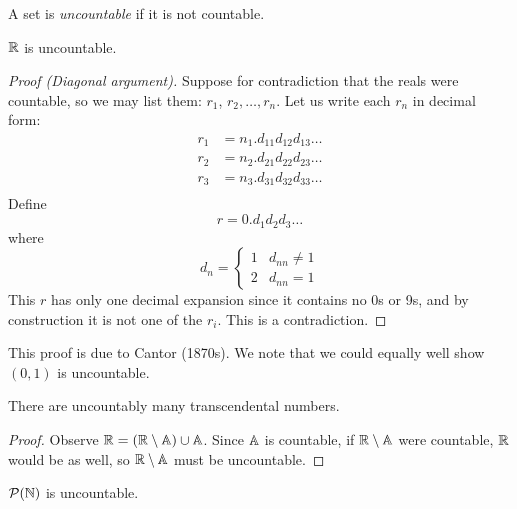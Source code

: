 \documentclass{../template/note}
\begin{document}
    \begin{definition}[Uncountability]
        A set is \emph{uncountable} if it is not countable.
    \end{definition}
    

    \begin{theorem}
        \(\RR\) is uncountable.
    \end{theorem}
    
    \begin{proof}[Proof (Diagonal argument)]
        Suppose for contradiction that the reals were countable, so we may list them: \(r_1\), \(r_2, \dots, r_n\). Let us write each \(r_n\) in decimal form:
        \begin{align*}
            r_1 &= n_1.d_{11}d_{12}d_{13}\dots \\
            r_2 &= n_2.d_{21}d_{22}d_{23}\dots \\
            r_3 &= n_3.d_{31}d_{32}d_{33}\dots \\
        \end{align*}
        Define
        \[
            r = 0.d_1d_2d_3\dots
        \]
        where
        \[
            d_n = \begin{cases}
                1 & d_{nn} \neq 1 \\
                2 & d_{nn} = 1
            \end{cases}
        \]
        This \(r\) has only one decimal expansion since it contains no 0s or 9s, and by construction it is not one of the \(r_i\). This is a contradiction.
    \end{proof}
    
    This proof is due to Cantor (1870s). We note that we could equally well show \((0, 1)\) is uncountable.

    \begin{corollary}
        There are uncountably many transcendental numbers.
    \end{corollary}
    
    \begin{proof}
        Observe \(\RR = (\RR \setminus \AA) \cup \AA\). Since \(\AA\) is countable, if \(\RR \setminus \AA\) were countable, \(\RR\) would be as well, so \(\RR \setminus \AA\) must be uncountable.
    \end{proof}
    
    \begin{theorem}
        \(\mathcal P(\NN)\) is uncountable.
    \end{theorem}
    
\end{document}
